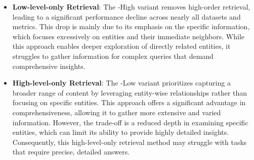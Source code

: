 \begin{itemize}[leftmargin=*]
    \item \textbf{Low-level-only Retrieval}: The -High variant removes high-order retrieval, leading to a significant performance decline across nearly all datasets and metrics. This drop is mainly due to its emphasis on the specific information, which focuses excessively on entities and their immediate neighbors. While this approach enables deeper exploration of directly related entities, it struggles to gather information for complex queries that demand comprehensive insights.

    \item \textbf{High-level-only Retrieval}: The -Low variant prioritizes capturing a broader range of content by leveraging entity-wise relationships rather than focusing on specific entities. This approach offers a significant advantage in comprehensiveness, allowing it to gather more extensive and varied information. However, the trade-off is a reduced depth in examining specific entities, which can limit its ability to provide highly detailed insights. Consequently, this high-level-only retrieval method may struggle with tasks that require precise, detailed answers.


\end{itemize}
